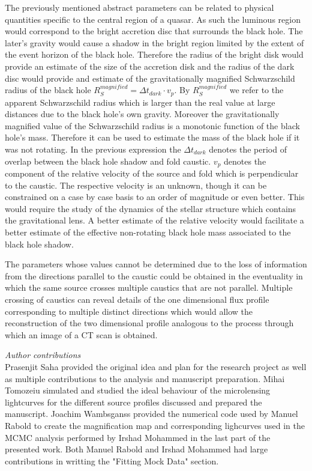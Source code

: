 \documentclass[usenatbib]{mn2e}
\begin{document}
The previously mentioned abstract parameters can be related to
physical quantities specific to the central region of a quasar.  As
such the luminous region would correspond to the bright accretion disc
that surrounds the black hole. The later's gravity would cause a
shadow in the bright region limited by the extent of the event horizon
of the black hole. Therefore the radius of the bright disk would
provide an estimate of the size of the accretion disk and the radius
of the dark disc would provide and estimate of the gravitationally
magnified Schwarzschild radius of the black hole $R_{S}^{magnified} =
\Delta t_{dark} \cdot v_p$.  By $R_{S}^{magnified}$ we refer to the
apparent Schwarzschild radius which is larger than the real value at
large distances due to the black hole's own gravity.  Moreover the
gravitationally magnified value of the Schwarzschild radius is a
monotonic function of the black hole's mass. Therefore it can be used
to estimate the mass of the black hole if it was not rotating. In the
previous expression the $\Delta t_{dark}$ denotes the period of
overlap between the black hole shadow and fold caustic.  $v_p$ denotes
the component of the relative velocity of the source and fold which is
perpendicular to the caustic.  The respective velocity is an unknown,
though it can be constrained on a case by case basis to an order of
magnitude or even better. This would require the study of the dynamics
of the stellar structure which contains the gravitational lens.  A
better estimate of the relative velocity would facilitate a better
estimate of the effective non-rotating black hole mass associated to
the black hole shadow.

    
The parameters whose values cannot be determined due to the loss of information from the directions parallel to the 
caustic could be obtained in the eventuality in which the same source crosses multiple caustics that are not parallel. 
Multiple crossing of caustics can reveal details of the one dimensional flux profile corresponding to multiple distinct 
directions which would allow the reconstruction of the two dimensional profile analogous to the process through which an image of a CT scan is obtained.  

\textit{Author contributions}\\
Prasenjit Saha provided the original idea and plan for the research project as well as multiple contributions to the analysis and manuscript preparation. Mihai Tomozeiu simulated and studied the ideal behaviour of the microlensing lightcurves for the different source profiles discussed and prepared the manuscript.
 Joachim Wambsganss provided the numerical code used by Manuel Rabold to create the magnification map and corresponding lighcurves 
used in the MCMC analysis performed by Irshad Mohammed in the last part of the presented work. Both Manuel Rabold and Irshad Mohammed had large contributions in writting the "Fitting Mock Data" section.





\def\apj{ApJ}
\def\apjl{ApJL}
\def\aj{AJ}
\def\mnras{MNRAS}
\def\aap{A\&A}
\def\nat{nature}
\def\araa{ARAA}
\def\pasa{PASA}

\end{document}
